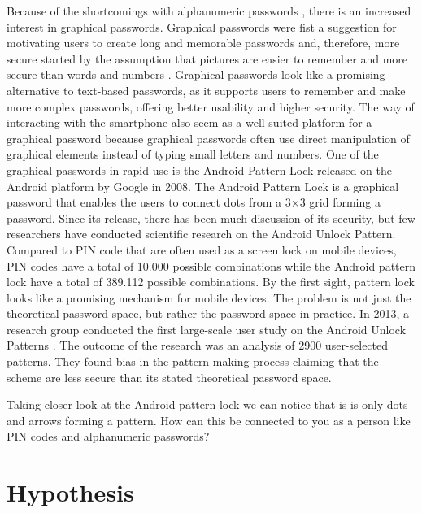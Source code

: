 		Because of the shortcomings with alphanumeric passwords \cite{UnixPasswords}, there is an increased interest in graphical passwords. Graphical passwords were fist a suggestion for motivating users to create long and memorable passwords and, therefore, more secure started by the assumption that pictures are easier to remember and more secure than words and numbers \cite{DeAngeli}. Graphical passwords look like a promising alternative to text-based passwords, as it supports users to remember and make more complex passwords, offering better usability and higher security. The way of interacting with the smartphone also seem as a well-suited platform for a graphical password because graphical passwords often use direct manipulation of graphical elements instead of typing small letters and numbers. One of the graphical passwords in rapid use is the Android Pattern Lock released on the Android platform by Google in 2008. The Android Pattern Lock is a graphical password that enables the users to connect dots from a 3$\times$3 grid forming a password. Since its release, there has been much discussion of its security, but few researchers have conducted scientific research on the Android Unlock Pattern. Compared to PIN code that are often used as a screen lock on mobile devices, PIN codes have a total of 10.000 possible combinations while the Android pattern lock have a total of 389.112 possible combinations. By the first sight, pattern lock looks like a promising mechanism for mobile devices. The problem is not just the theoretical password space, but rather the password space in practice. In 2013, a research group conducted the first large-scale user study on the Android Unlock Patterns \cite{Uellenbeck}. The outcome of the research was an analysis of 2900 user-selected patterns. They found bias in the pattern making process claiming that the scheme are less secure than its stated theoretical password space.

		Taking closer look at the Android pattern lock we can notice that is is only dots and arrows forming a pattern. How can this be connected to you as a person like PIN codes and alphanumeric passwords?
		 

	\section{Hypothesis}\label{sec:hypothesis}

